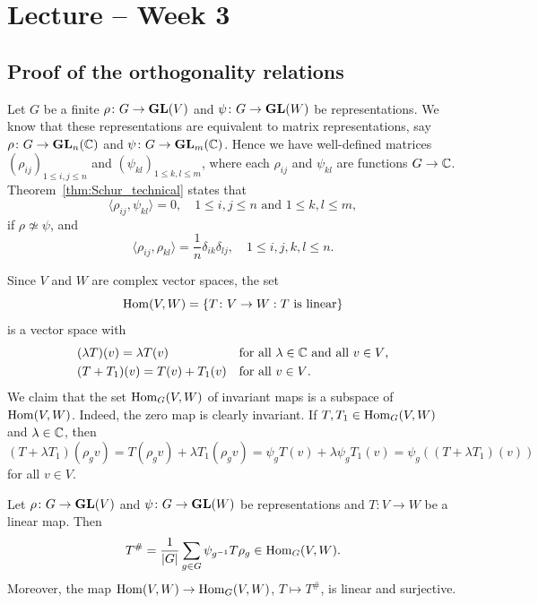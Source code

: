 \section{Lecture -- Week 3}
\label{8}

\subsection{Proof of the orthogonality relations}
\label{subsection:Schur_proof}

Let $G$ be a finite $\rho\colon G\to\mathbf{GL}(V)$ and $\psi\colon G\to\mathbf{GL}(W)$ be representations. We know that
these representations are equivalent to matrix representations, say 
$\rho\colon G\to\mathbf{GL}_n(\mathbb{C})$
and $\psi\colon G\to\mathbf{GL}_m(\mathbb{C})$. Hence 
we have well-defined matrices
$(\rho_{ij})_{1\leq i,j\leq n}$ and 
$(\psi_{kl})_{1\leq k,l\leq m}$, where 
each $\rho_{ij}$ and $\psi_{kl}$ are
functions $G\to\mathbb{C}$. Theorem~\ref{thm:Schur_technical} 
states that 
\[
\langle\rho_{ij},\psi_{kl}\rangle=0, 
\quad 
1\leq i,j\leq n\text{ and }1\leq k,l\leq m, 
\]
if $\rho\not\simeq\psi$, and 
\[
\langle\rho_{ij},\rho_{kl}\rangle=\frac{1}{n}\delta_{ik}\delta_{lj},\quad 1\leq i,j,k,l\leq n.  
\]

Since $V$ and $W$ are complex 
vector spaces, the set 
\[
\operatorname{Hom}(V,W)=\{T\colon V\to W:\text{$T$ is linear}\}
\]
is a vector space with 
\begin{align*}
&(\lambda T)(v)=\lambda T(v) && \text{for all $\lambda\in\mathbb{C}$ and all $v\in V$,}\\ 
&(T+T_1)(v)=T(v)+T_1(v) &&\text{for all $v\in V$.}
\end{align*}
We claim that the set $\operatorname{Hom}_G(V,W)$ of invariant maps
is a subspace of $\operatorname{Hom}(V,W)$. Indeed, the zero map is clearly invariant. If $T,T_1\in\operatorname{Hom}_G(V,W)$ 
and $\lambda\in\mathbb{C}$, then
\[
(T+\lambda T_1)(\rho_g v)
=T(\rho_gv)+\lambda T_1(\rho_gv)
=\psi_gT(v)+\lambda \psi_gT_1(v)
=\psi_g((T+\lambda T_1)(v))
\]
for all $v\in V$. 
 
\begin{proposition}
\label{pro:T_invariant}
	Let $\rho\colon G\to\mathbf{GL}(V)$ and $\psi\colon G\to\mathbf{GL}(W)$ be representations
	and $T\colon V\to W$ be a linear map. Then
	\[
	T^{\#}=\frac{1}{|G|}\sum_{g\in G}\psi_{g^{-1}}T\rho_g\in\operatorname{Hom}_G(V,W).
	\]
	Moreover, the map $\operatorname{Hom}(V,W)\to\operatorname{Hom}_G(V,W)$, $T\mapsto T^{\#}$, is linear and surjective.  
\end{proposition}

